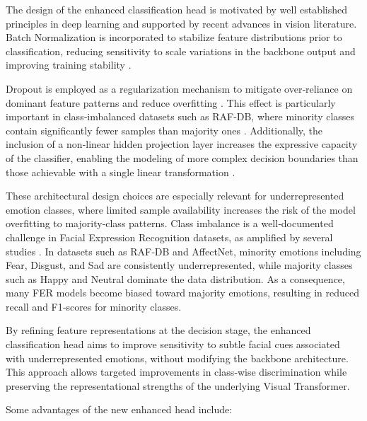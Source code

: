 The design of the enhanced classification head is motivated by well established principles in deep learning and supported by recent advances in vision literature. Batch Normalization is incorporated to stabilize feature distributions prior to classification, reducing sensitivity to scale variations in the backbone output and improving training stability \cite{ioffe_batch_2015, steiner_how_2022}.

Dropout is employed as a regularization mechanism to mitigate over‑reliance on dominant feature patterns and reduce overfitting \cite{srivastava_dropout_nodate}. This effect is particularly important in class‑imbalanced datasets such as RAF‑DB, where minority classes contain significantly fewer samples than majority ones \cite{zhang_leave_2023}. Additionally, the inclusion of a non‑linear hidden projection layer increases the expressive capacity of the classifier, enabling the modeling of more complex decision boundaries than those achievable with a single linear transformation \cite{yu_rethinking_2021, tolstikhin_mlp-mixer_2021, abdullah_activator_2024}.


These architectural design choices are especially relevant for underrepresented emotion classes, where limited sample availability increases the risk of the model overfitting to majority‑class patterns. Class imbalance is a well‑documented challenge in Facial Expression Recognition datasets, as amplified by several studies \cite{li_reliable_2017, mollahosseini_affectnet_2019, zhang_leave_2023}. In datasets such as RAF‑DB and AffectNet, minority emotions including Fear, Disgust, and Sad are consistently underrepresented, while majority classes such as Happy and Neutral dominate the data distribution. As a consequence, many FER models become biased toward majority emotions, resulting in reduced recall and F1‑scores for minority classes.

By refining feature representations at the decision stage, the enhanced classification head aims to improve sensitivity to subtle facial cues associated with underrepresented emotions, without modifying the backbone architecture. This approach allows targeted improvements in class‑wise discrimination while preserving the representational strengths of the underlying Visual Transformer.


Some advantages of the new enhanced head include:

